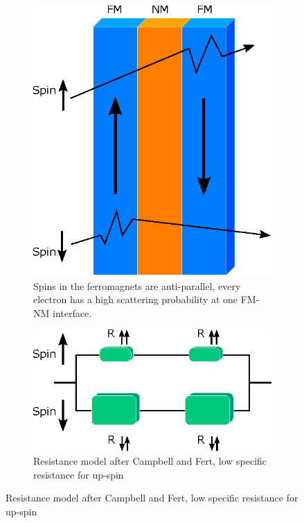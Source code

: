 \begin{figure}[t]
\begin{subfigure}[r]{0.49\linewidth}
		\includegraphics[clip,trim={0mm 0mm 0mm 0mm},scale=.6]{Ressourcen/IMG/Spin-valve-GMRanti.eps}
		\caption{Spins in the ferromagnets are anti-parallel, every electron has a high scattering probability at one FM-NM interface.}
		\label{fig:nano:GMR:anti}
	\end{subfigure}
	\vfil
	\begin{subfigure}[l]{0.49\linewidth} 
		\centering
		\includegraphics[clip,trim={0mm 0mm 0mm 0mm}, scale=.6]{Ressourcen/IMG/Spin-valve-Rparallel.eps}
		\caption{Resistance model after Campbell and Fert, low specific resistance for up-spin}

\end{subfigure}
\end{figure}
